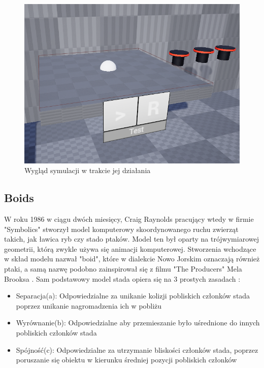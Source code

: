 \documentclass[a4paper,12pt,reqno]{article}
\begin{document}
\begin{figure}[H]%
\centering
\includegraphics[width=0.5\columnwidth]{graphics/agent/AgentInUE_1.png}
\caption{Wygląd symulacji w trakcie jej działania
\label{BPExample}}%
%
\qquad
\end{figure}  



\newpage
\subsection{Boids}

W roku 1986 w ciągu dwóch miesięcy, Craig Raynolds pracujący wtedy w firmie "Symbolics" stworzył model komputerowy skoordynowanego ruchu zwierząt takich, jak ławica ryb czy stado ptaków. Model ten był oparty na trójwymiarowej geometrii, którą zwykle używa się animacji komputerowej. Stworzenia wchodzące w skład modelu nazwał "boid", które w dialekcie Nowo Jorskim oznaczają również ptaki, a samą nazwę podobno zainspirował się z filmu "The Producers" Mela Brooksa \cite{boids_name}. Sam podstawowy model stada opiera się na 3 prostych zasadach \cite{flocking_system}:

\begin{itemize}
\item Separacja(a): Odpowiedzialne za unikanie kolizji pobliskich członków stada poprzez unikanie nagromadzenia ich w pobliżu
\item Wyrównanie(b): Odpowiedzialne aby przemieszanie było uśrednione do innych pobliskich członków stada
\item Spójność(c): Odpowiedzialne za utrzymanie bliskości członków stada, poprzez poruszanie się obiektu w kierunku średniej pozycji pobliskich członków
\end{itemize}
\end{document}
